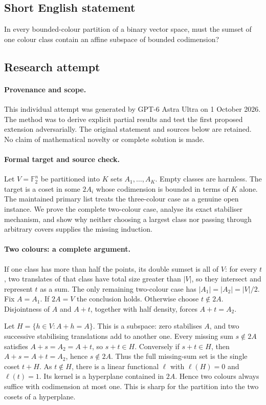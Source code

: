 \documentclass[11pt,a4paper]{article}
\newcommand{\F}{\mathbb{F}}
\begin{document}
\subsection{Short English statement}

In every bounded-colour partition of a binary vector space, must the sumset of one colour class contain an affine subspace of bounded codimension?

\subsection{Research attempt}

\paragraph{Provenance and scope.}
This individual attempt was generated by GPT-6 Astra Ultra on 1 October 2026. The method was to derive explicit partial results and test the first proposed extension adversarially. The original statement and sources below are retained. No claim of mathematical novelty or complete solution is made.

\paragraph{Formal target and source check.}
Let $V=\F_2^n$ be partitioned into $K$ sets $A_1,\ldots,A_K$. Empty classes are harmless. The target is a coset in some $2A_i$ whose codimension is bounded in terms of $K$ alone. The maintained primary list treats the three-colour case as a genuine open instance. We prove the complete two-colour case, analyse its exact stabiliser mechanism, and show why neither choosing a largest class nor passing through arbitrary covers supplies the missing induction.

\paragraph{Two colours: a complete argument.}
If one class has more than half the points, its double sumset is all of $V$: for every $t$, two translates of that class have total size greater than $|V|$, so they intersect and represent $t$ as a sum. The only remaining two-colour case has $|A_1|=|A_2|=|V|/2$. Fix $A=A_1$. If $2A=V$ the conclusion holds. Otherwise choose $t\notin2A$. Disjointness of $A$ and $A+t$, together with half density, forces $A+t=A_2$.

Let $H=\{h\in V:A+h=A\}$. This is a subspace: zero stabilises $A$, and two successive stabilising translations add to another one. Every missing sum $s\notin2A$ satisfies $A+s=A_2=A+t$, so $s+t\in H$. Conversely if $s+t\in H$, then $A+s=A+t=A_2$, hence $s\notin2A$. Thus the full missing-sum set is the single coset $t+H$. As $t\notin H$, there is a linear functional $\ell$ with $\ell(H)=0$ and $\ell(t)=1$. Its kernel is a hyperplane contained in $2A$. Hence two colours always suffice with codimension at most one. This is sharp for the partition into the two cosets of a hyperplane.
\end{document}
